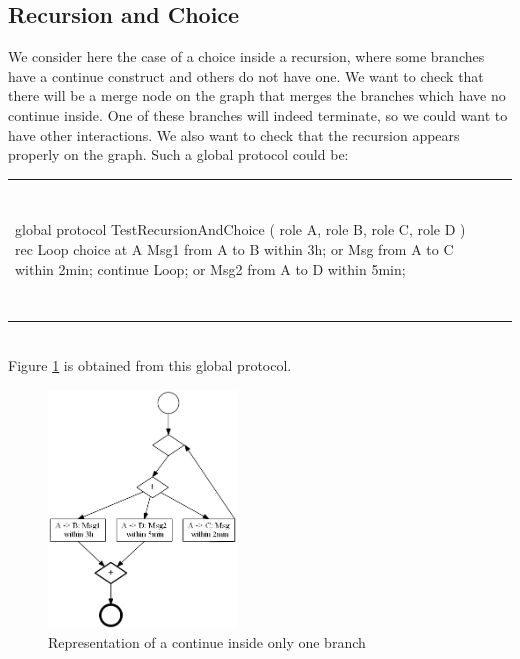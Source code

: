 \documentclass[a4paper,11pt,twoside]{report}
\begin{document}
\subsection{Recursion and Choice}
We consider here the case of a choice inside a recursion, where some branches have a continue construct and others do not have one. We want to check that there will be a merge node on the graph that merges the branches which have no continue inside. One of these branches will indeed terminate, so we could want to have other interactions. We also want to check that the recursion appears properly on the graph. Such a global protocol could be:\\
\begin{tabular}{ll}
~~&~~ \\
\begin{SJLISTING}
global protocol TestRecursionAndChoice ( role A, role B, role C, role D ) {
	rec Loop {
		choice at A {
			 Msg1 from A to B within 3h;
		} or {
			 Msg from A to C within 2min;
 			continue Loop;
		}  or { 
			Msg2 from A to D within 5min;
		}
	}
}
\end{SJLISTING}
& \\
~&~\\
\end{tabular}\\
Figure \ref{fig:RecursionChoice} is obtained from this global protocol.

\begin{figure}[h]
\begin{center}
\includegraphics[width=5cm]{TestRecursionAndChoice}\caption{Representation of a continue inside only one branch}\label{fig:RecursionChoice}
\end{center}
\end{figure}
\end{document}
